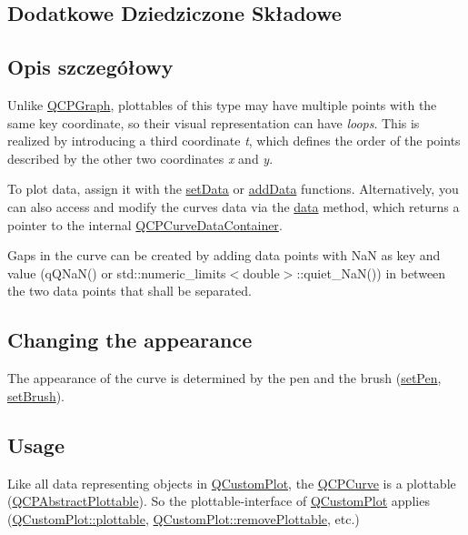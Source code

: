 \subsection*{Dodatkowe Dziedziczone Składowe}


\subsection{Opis szczegółowy}


Unlike \hyperlink{class_q_c_p_graph}{Q\+C\+P\+Graph}, plottables of this type may have multiple points with the same key coordinate, so their visual representation can have {\itshape loops}. This is realized by introducing a third coordinate {\itshape t}, which defines the order of the points described by the other two coordinates {\itshape x} and {\itshape y}.

To plot data, assign it with the \hyperlink{class_q_c_p_curve_a41246850d2e080bc57183ca19cd4135e}{set\+Data} or \hyperlink{class_q_c_p_curve_a73edf394b94f3f24f07518e30565a07f}{add\+Data} functions. Alternatively, you can also access and modify the curve\textquotesingle{}s data via the \hyperlink{class_q_c_p_curve_ad89c71fdd1726506c21c0cc471547368}{data} method, which returns a pointer to the internal \hyperlink{qcustomplot_8hh_aaeee80d5664ea91beb9d7968790d0e65}{Q\+C\+P\+Curve\+Data\+Container}.

Gaps in the curve can be created by adding data points with NaN as key and value ({\ttfamily q\+Q\+Na\+N()} or {\ttfamily std\+::numeric\+\_\+limits$<$double$>$\+::quiet\+\_\+\+Na\+N()}) in between the two data points that shall be separated.\hypertarget{class_q_c_p_curve_qcpcurve-appearance}{}\subsection{Changing the appearance}\label{class_q_c_p_curve_qcpcurve-appearance}
The appearance of the curve is determined by the pen and the brush (\hyperlink{class_q_c_p_abstract_plottable_ab74b09ae4c0e7e13142fe4b5bf46cac7}{set\+Pen}, \hyperlink{class_q_c_p_abstract_plottable_a7a4b92144dca6453a1f0f210e27edc74}{set\+Brush}).\hypertarget{class_q_c_p_curve_qcpcurve-usage}{}\subsection{Usage}\label{class_q_c_p_curve_qcpcurve-usage}
Like all data representing objects in \hyperlink{class_q_custom_plot}{Q\+Custom\+Plot}, the \hyperlink{class_q_c_p_curve}{Q\+C\+P\+Curve} is a plottable (\hyperlink{class_q_c_p_abstract_plottable}{Q\+C\+P\+Abstract\+Plottable}). So the plottable-\/interface of \hyperlink{class_q_custom_plot}{Q\+Custom\+Plot} applies (\hyperlink{class_q_custom_plot_a32de81ff53e263e785b83b52ecd99d6f}{Q\+Custom\+Plot\+::plottable}, \hyperlink{class_q_custom_plot_af3dafd56884208474f311d6226513ab2}{Q\+Custom\+Plot\+::remove\+Plottable}, etc.)

